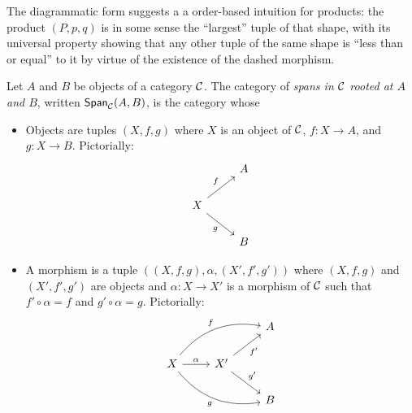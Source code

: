 The diagrammatic form suggests a
a order-based intuition for products:
the product \((P,p,q)\) is
in some sense the ``largest''
tuple of that shape,
with its universal property
showing that any other tuple of the same shape is
``less than or equal'' to it by virtue of the existence of
the dashed morphism.

\begin{definition}
  \sloppy
  Let \(A\) and \(B\) be objects of a category \(\mathcal C\).
The category of \emph{spans in \(\mathcal C\) rooted at \(A\) and \(B\)},
written \(\mathsf{Span}_\mathcal C(A,B)\),
is the category whose
\begin{itemize}
  \item Objects are tuples \((X,f,g)\)
    where \(X\) is an object of \(\mathcal C\),
    \(f : X \to A\), and \(g : X \to B\).
    Pictorially:
    \[%
\begin{tikzcd}
                                   & A \\
X \arrow[rd, "g"'] \arrow[ru, "f"] &   \\
                                   & B
\end{tikzcd}\]
  \item A morphism is a tuple
    \(((X,f,g),\alpha,(X',f',g'))\)
    where \((X,f,g)\) and  \((X',f',g')\)
    are objects and \(\alpha : X \to X'\)
    is a morphism of \(\mathcal C\)
    such that \(f' \circ \alpha = f\)
    and \(g' \circ \alpha = g\).
    Pictorially:
    \[%
\begin{tikzcd}
                                                                                &                                       & A \\
X \arrow[rrd, "g"', bend right] \arrow[rru, "f", bend left] \arrow[r, "\alpha"] & X' \arrow[ru, "f'"'] \arrow[rd, "g'"] &   \\
                                                                                &                                       & B
\end{tikzcd}\]


\end{itemize}
\end{definition}
